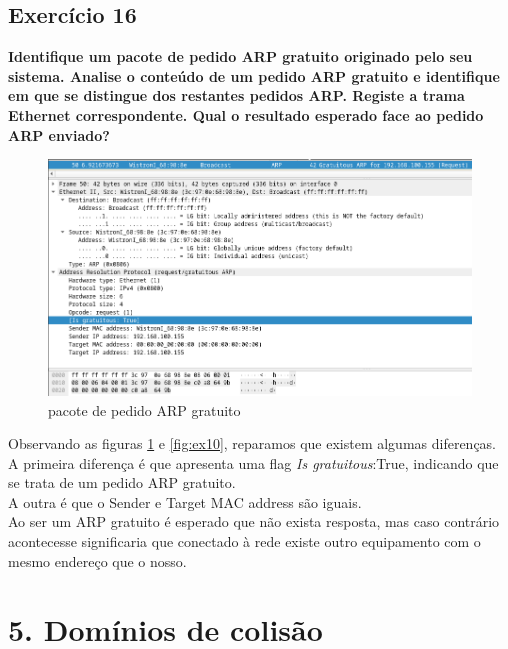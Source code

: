\documentclass[a4paper]{report}
\begin{document}
\section{Exercício 16}
\textbf{Identifique um pacote de pedido ARP gratuito originado pelo seu sistema.
Analise o conteúdo de um pedido ARP gratuito e identifique em que se distingue
dos restantes pedidos ARP. Registe a trama Ethernet correspondente. Qual o
resultado esperado face ao pedido ARP enviado?}

\begin{figure}[H]
    \centering 
    \includegraphics[width=\textwidth]{images/ex16.png}
    \caption{pacote de pedido ARP gratuito}
    \label{fig:ex16}
\end{figure}
Observando as figuras \ref{fig:ex16} e \ref{fig:ex10}, reparamos que existem
algumas diferenças.\\
A primeira diferença é que apresenta uma flag \textit{Is gratuitous}:True,
indicando que se trata de um pedido ARP gratuito.\\
A outra é que o Sender e Target MAC address são iguais.\\
Ao ser um ARP gratuito é esperado que não exista resposta, mas caso contrário
acontecesse significaria que conectado à rede existe outro equipamento com o
mesmo endereço que o nosso.

\chapter{5. Domínios de colisão}
\end{document}
